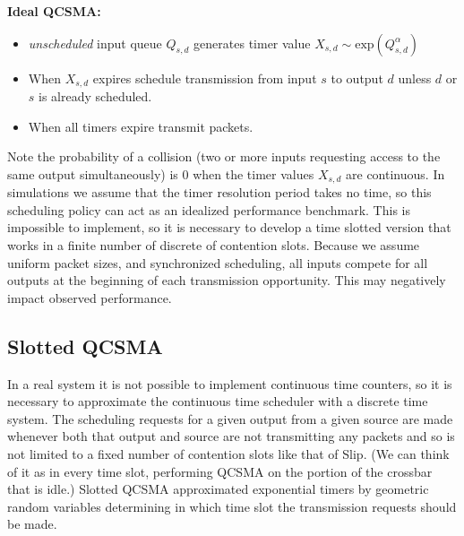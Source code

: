 \documentclass{IEEEtran}%
\begin{document}
{\bf Ideal QCSMA:}
\begin{itemize}
\item {\it unscheduled} input queue $Q_{s,d}$ generates timer value $X_{s,d}\sim \text{exp}(Q_{s,d}^\alpha)$
\item When $X_{s,d}$ expires schedule transmission from input $s$ to output $d$ unless $d$ or $s$ is already scheduled.
\item When all timers expire transmit packets.\\
\end{itemize}

Note the probability of a collision (two or more inputs requesting access to the same output simultaneously) is 0 when the timer values $X_{s,d}$ are continuous.  In simulations we assume that the timer resolution period takes no time, so this scheduling policy can act as an idealized performance benchmark.  This is impossible to implement, so it is necessary to develop a time slotted version that works in a finite number of discrete of contention slots.  Because we assume uniform packet sizes, and synchronized scheduling, all inputs compete for all outputs at the beginning of each transmission opportunity.  This may negatively impact observed performance.%

\subsection{Slotted QCSMA} \label{naive_qcsma}


In a real system it is not possible to implement continuous time counters, so it is necessary to approximate the continuous time scheduler with a discrete time system.  The scheduling requests for a given output from a given source are made whenever both that output and source are not transmitting any packets and so is not limited to a fixed number of contention slots like that of Slip.  (We can think of it as in every time slot, performing QCSMA on the portion of the crossbar that is idle.)  Slotted QCSMA approximated exponential timers by geometric random variables determining in which time slot the transmission requests should be made.
\end{document}
